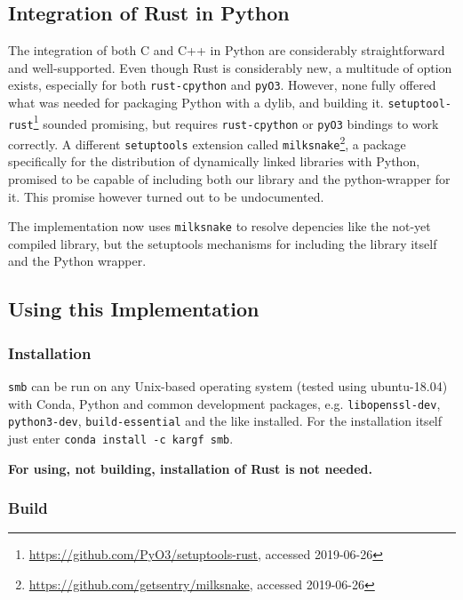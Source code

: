 \subsection{Integration of Rust in Python}\label{sec:integration}


The integration of both C and C++ in Python are considerably straightforward
and well-supported. Even though Rust is considerably new, a multitude of option
exists, especially for both \verb|rust-cpython| and \verb|pyO3|. However, none
fully offered what was needed for packaging Python with a dylib, and building
it.
\verb|setuptool-rust|\footnote{\url{https://github.com/PyO3/setuptools-rust},
accessed 2019-06-26} sounded promising, but requires \verb|rust-cpython| or
\verb|pyO3| bindings to work correctly. A different \verb|setuptools| extension
called \verb|milksnake|\footnote{\url{https://github.com/getsentry/milksnake},
accessed 2019-06-26}, a package specifically for the distribution of
dynamically linked libraries with Python, promised to be capable of including
both our library and the python-wrapper for it. This promise however turned out
to be undocumented.

The implementation now uses \verb|milksnake| to resolve depencies like the
not-yet compiled library, but the setuptools mechanisms for including the
library itself and the Python wrapper.




\subsection{Using this Implementation}\label{sec:using}

\subsubsection{Installation}\label{sec:install}


\verb|smb| can be run on any Unix-based operating system (tested using ubuntu-18.04)
with Conda, Python and common development packages, e.g.
\verb!libopenssl-dev!, \verb!python3-dev!, \verb!build-essential! and the like
installed. For the installation itself just enter \verb|conda install -c kargf smb|.

\textbf{For using, not building, installation of Rust is not needed.}


\subsubsection{Build}\label{sec:build}

